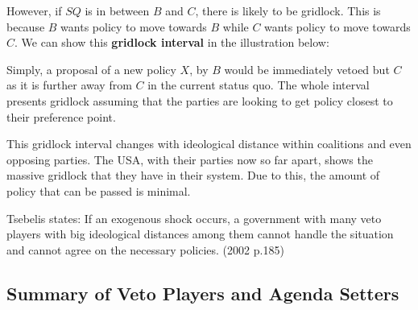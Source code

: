 \documentclass[12pt, letterpaper]{article}
\begin{document}
However, if $SQ$ is in between $B$ and $C$, there is likely to be gridlock. This is because $B$ wants policy to move towards $B$ while $C$ wants policy to move towards $C$. We can show this \textbf{gridlock interval} in the illustration below:
\begin{center}
\end{center}
Simply, a proposal of a new policy $X$, by $B$ would be immediately vetoed but $C$ as it is further away from $C$ in the current status quo. The whole interval presents gridlock assuming that the parties are looking to get policy closest to their preference point.

This gridlock interval changes with ideological distance within coalitions and even opposing parties. The USA, with their parties now so far apart, shows the massive gridlock that they have in their system. Due to this, the amount of policy that can be passed is minimal.
\begin{center}
Tsebelis states: If an exogenous shock occurs, a government with many veto players with big ideological distances among them cannot handle the situation and cannot agree on the necessary policies. (2002 p.185)
\end{center}

\subsection{Summary of Veto Players and Agenda Setters}

\newpage
\end{document}
